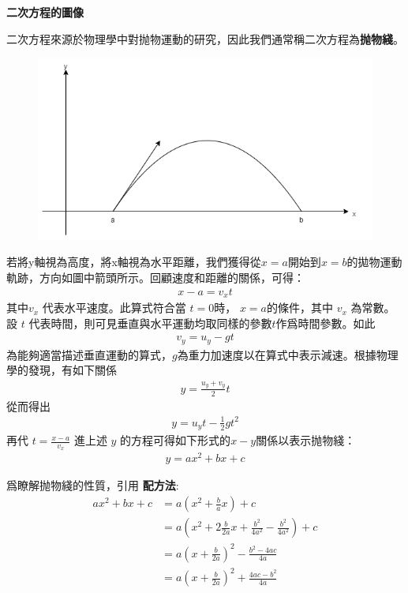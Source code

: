 \documentclass[12pt]{article}
\begin{document}
    \begin{center}
        \textbf{二次方程的圖像}
    \end{center}

    二次方程來源於物理學中對抛物運動的研究，因此我們通常稱二次方程為\textbf{抛物綫}。

    \begin{figure}[H]
        \centering
        \includegraphics[scale=0.8]{parabola.png}
    \end{figure}

    若將y軸視為高度，將x軸視為水平距離，我們獲得從$x=a$開始到$x=b$的拋物運動軌跡，方向如圖中箭頭所示。回顧速度和距離的關係，可得： \begin{align*}
        x-a=v_x t
    \end{align*}其中$v_x$ 代表水平速度。此算式符合當 $t=0$時， $x=a$的條件，其中 $v_x$ 為常數。設 $t$ 代表時間，則可見垂直與水平運動均取同樣的參數$t$作爲時間參數。如此 \begin{align*}
        v_y=u_y-gt
    \end{align*}
    為能夠適當描述垂直運動的算式，$g$為重力加速度以在算式中表示減速。根據物理學的發現，有如下關係 \begin{align*}
        y=\frac{u_y+v_y}{2}t
    \end{align*} 從而得出 \begin{align*}
        y=u_y t-\frac{1}{2}gt^2
    \end{align*} 再代 $t=\frac{x-a}{v_x}$ 進上述 $y$ 的方程可得如下形式的$x-y$關係以表示抛物綫：\begin{align*}
        y=ax^2+bx+c
    \end{align*}

    爲瞭解抛物綫的性質，引用 \textbf{配方法}:\begin{align*}
        ax^2+bx+c&=a(x^2+\frac{b}{a}x)+c\\
        &=a(x^2+2\frac{b}{2a}x+\frac{b^2}{4a^2}-\frac{b^2}{4a^2})+c\\
        &=a(x+\frac{b}{2a})^2-\frac{b^2-4ac}{4a}\\
        &=a(x+\frac{b}{2a})^2+\frac{4ac-b^2}{4a}
    \end{align*}
\end{document}
